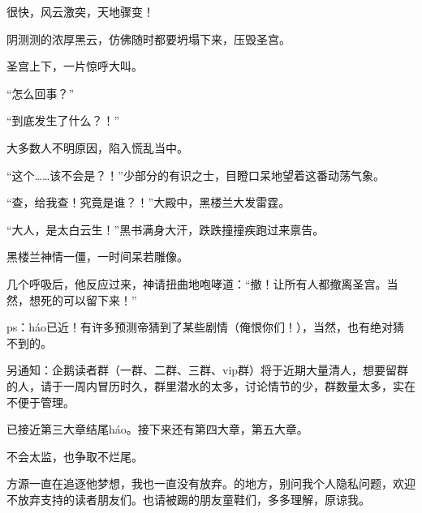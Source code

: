 \begin{this_body}
很快，风云激突，天地骤变！

阴测测的浓厚黑云，仿佛随时都要坍塌下来，压毁圣宫。

圣宫上下，一片惊呼大叫。

“怎么回事？”

“到底发生了什么？！”

大多数人不明原因，陷入慌乱当中。

“这个……该不会是？！”少部分的有识之士，目瞪口呆地望着这番动荡气象。

“查，给我查！究竟是谁？！”大殿中，黑楼兰大发雷霆。

“大人，是太白云生！”黑书满身大汗，跌跌撞撞疾跑过来禀告。

黑楼兰神情一僵，一时间呆若雕像。

几个呼吸后，他反应过来，神请扭曲地咆哮道：“撤！让所有人都撤离圣宫。当然，想死的可以留下来！”

ps：háo已近！有许多预测帝猜到了某些剧情（俺恨你们！），当然，也有绝对猜不到的。

另通知：企鹅读者群（一群、二群、三群、vip群）将于近期大量清人，想要留群的人，请于一周内冒历时久，群里潜水的太多，讨论情节的少，群数量太多，实在不便于管理。

已接近第三大章结尾háo。接下来还有第四大章，第五大章。

不会太监，也争取不烂尾。

方源一直在追逐他梦想，我也一直没有放弃。的地方，别问我个人隐私问题，欢迎不放弃支持的读者朋友们。也请被踢的朋友童鞋们，多多理解，原谅我。

\end{this_body}

